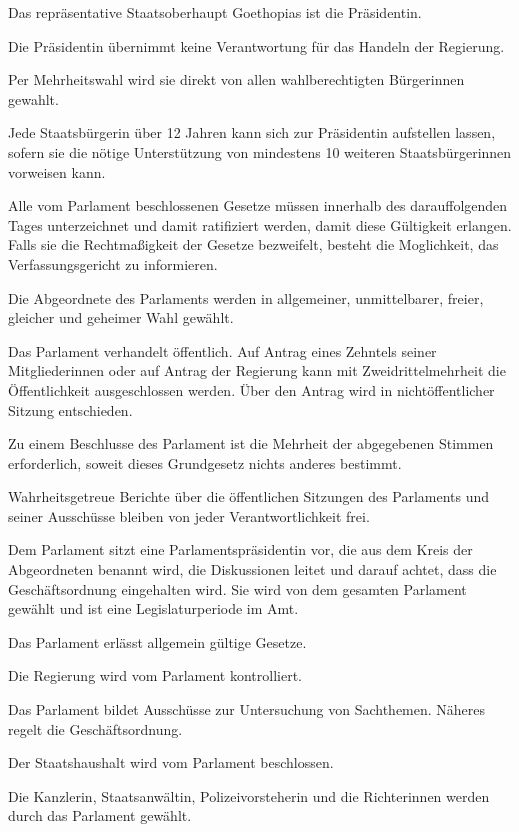 \documentclass{sasbase}
\begin{document}
\begin{article}[Präsidentin]
	\item Das repräsentative Staatsoberhaupt Goethopias ist die Präsidentin.
	\item Die Präsidentin übernimmt keine Verantwortung für das Handeln der Regierung.
	\item Per Mehrheitswahl wird sie direkt von allen wahlberechtigten Bürgerinnen gewahlt.
	\item Jede Staatsbürgerin über 12 Jahren kann sich zur Präsidentin aufstellen lassen, sofern sie die nötige Unterstützung von mindestens 10 weiteren Staatsbürgerinnen vorweisen kann.
	\item Alle vom Parlament beschlossenen Gesetze müssen innerhalb des darauffolgenden Tages unterzeichnet und damit ratifiziert werden, damit diese Gültigkeit erlangen. Falls sie die Rechtmaßigkeit der Gesetze bezweifelt, besteht die Moglichkeit, das Verfassungsgericht zu informieren.
\end{article}


\begin{article}
	\item Die Abgeordnete des Parlaments werden in allgemeiner, unmittelbarer, freier, gleicher und geheimer Wahl gewählt.
	\item Das Parlament verhandelt öffentlich. Auf Antrag eines Zehntels seiner Mitgliederinnen oder auf Antrag der Regierung kann mit Zweidrittelmehrheit die Öffentlichkeit ausgeschlossen werden. Über den Antrag wird in nichtöffentlicher Sitzung entschieden.
	\item Zu einem Beschlusse des Parlament ist die Mehrheit der abgegebenen Stimmen erforderlich, soweit dieses Grundgesetz nichts anderes bestimmt.
	\item Wahrheitsgetreue Berichte über die öffentlichen Sitzungen des Parlaments und seiner Ausschüsse bleiben von jeder Verantwortlichkeit frei.
	\item Dem Parlament sitzt eine Parlamentspräsidentin vor, die aus dem Kreis der Abgeordneten benannt wird, die Diskussionen leitet und darauf achtet, dass die Geschäftsordnung eingehalten wird. Sie wird von dem gesamten Parlament gewählt und ist eine Legislaturperiode im Amt.\end{article}

\begin{article}
	\item Das Parlament erlässt allgemein gültige Gesetze.
	\item Die Regierung wird vom Parlament kontrolliert.
	\item Das Parlament bildet Ausschüsse zur Untersuchung von Sachthemen. Näheres regelt die Geschäftsordnung.
	\item Der Staatshaushalt wird vom Parlament beschlossen.
	\item Die Kanzlerin, Staatsanwältin, Polizeivorsteherin und die Richterinnen werden durch das Parlament gewählt.
\end{article}
\end{document}

